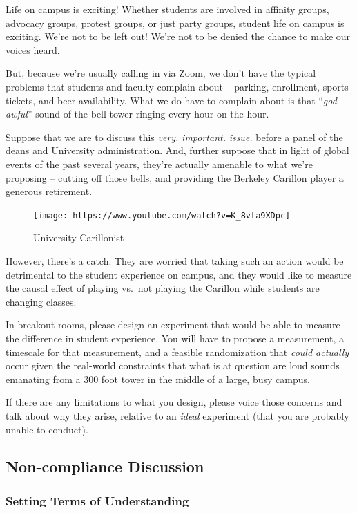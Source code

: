 \documentclass[
]{article}
\begin{document}
Life on campus is exciting! Whether students are involved in affinity groups, advocacy groups, protest groups, or just party groups, student life on campus is exciting. We're not to be left out! We're not to be denied the chance to make our voices heard.

But, because we're usually calling in via Zoom, we don't have the typical problems that students and faculty complain about -- parking, enrollment, sports tickets, and beer availability. What we do have to complain about is that ``\emph{god awful}'' sound of the bell-tower ringing every hour on the hour.

Suppose that we are to discuss this \emph{very.} \emph{important.} \emph{issue.} before a panel of the deans and University administration. And, further suppose that in light of global events of the past several years, they're actually amenable to what we're proposing -- cutting off those bells, and providing the Berkeley Carillon player a generous retirement.

\begin{figure}
\centering
\texttt{[image: https://www.youtube.com/watch?v=K\_8vta9XDpc]}
\caption{University Carillonist}
\end{figure}

However, there's a catch. They are worried that taking such an action would be detrimental to the student experience on campus, and they would like to measure the causal effect of playing vs.~not playing the Carillon while students are changing classes.

In breakout rooms, please design an experiment that would be able to measure the difference in student experience. You will have to propose a measurement, a timescale for that measurement, and a feasible randomization that \emph{could actually} occur given the real-world constraints that what is at question are loud sounds emanating from a 300 foot tower in the middle of a large, busy campus.

If there are any limitations to what you design, please voice those concerns and talk about why they arise, relative to an \emph{ideal} experiment (that you are probably unable to conduct).

\hypertarget{non-compliance-discussion}{%
\subsection{Non-compliance Discussion}\label{non-compliance-discussion}}

\hypertarget{setting-terms-of-understanding}{%
\subsubsection{Setting Terms of Understanding}\label{setting-terms-of-understanding}}
\end{document}
